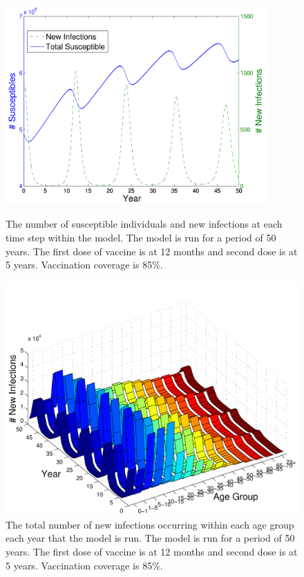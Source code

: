 \documentclass[a4paper,11pt] {scrartcl}
\begin{document}
\begin{figure}[hp]
	\centering
	\includegraphics[width=100mm]{measlesnowaningdouble85}
	\caption{The number of susceptible individuals and new infections at each time step within the model. The model is run for a period of 50 years. The first dose of vaccine is at 12 months and second dose is at 5 years. Vaccination coverage is 85\%.}
	\label{fig:resultsmeaslesnowaningdouble85}
	
	\includegraphics[width=120mm]{yearlytotalinfectionsdouble85}
	\caption{The total number of new infections occurring within each age group each year that the model is run. The model is run for a period of 50 years. The first dose of vaccine is at 12 months and second dose is at 5 years. Vaccination coverage is 85\%.}
	\label{fig:resultsyearlytotalinfectionsdouble85}
\end{figure}
\end{document}
